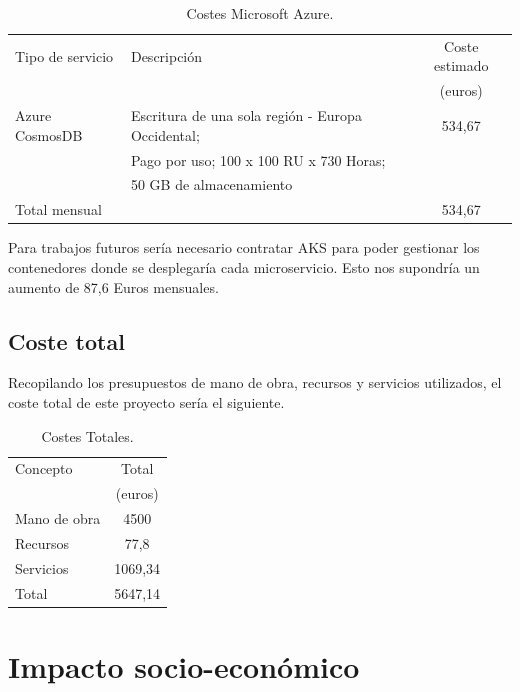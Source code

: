 \documentclass[12pt]{report} %
\begin{document}
\begin{table}[H]
	\begin{center}
		\begin{tabular}{|l|l|c|}
			\hline
			Tipo de servicio & Descripción & Coste estimado \\
			 &  & (euros) \\
			\hline \hline
			Azure CosmosDB & Escritura de una sola región - Europa Occidental; & 534,67 \\ 
			&  Pago por uso; 100 x 100 RU x 730 Horas; & \\
			& 50 GB de almacenamiento & \\ \hline \hline
			Total mensual &  & 534,67 \\ \hline
			
		\end{tabular}
		\caption{Costes Microsoft Azure.}
		\label{costeAzure}
	\end{center}
\end{table}

Para trabajos futuros sería necesario contratar AKS para poder gestionar los contenedores donde se desplegaría cada microservicio. Esto nos supondría un aumento de 87,6 Euros mensuales.

\subsection{Coste total}

Recopilando los presupuestos de mano de obra, recursos y servicios utilizados, el coste total de este proyecto sería el siguiente.

\begin{table}[H]
	\begin{center}
		\begin{tabular}{|l|c|}
			\hline
			Concepto & Total \\
			 & (euros) \\
			\hline \hline
			Mano de obra & 4500 \\ \hline
			Recursos & 77,8 \\ \hline
			Servicios & 1069,34 \\ \hline \hline
			Total & 5647,14 \\ \hline					
		\end{tabular}
		\caption{Costes Totales.}
		\label{costeTotal}
	\end{center}
\end{table}

\section{Impacto socio-económico}
\end{document}
